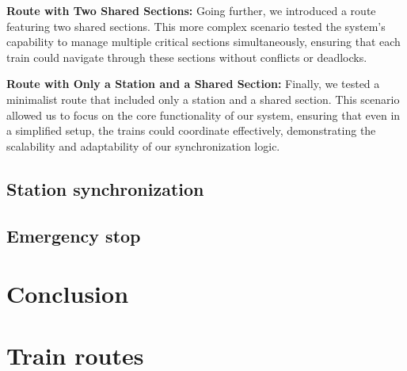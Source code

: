 \documentclass{article}
\begin{document}
    \textbf{Route with Two Shared Sections:} Going further, we introduced a route featuring two shared sections. This more complex scenario tested the system's capability to manage multiple critical sections simultaneously, ensuring that each train could navigate through these sections without conflicts or deadlocks.

    \textbf{Route with Only a Station and a Shared Section:} Finally, we tested a minimalist route that included only a station and a shared section. This scenario allowed us to focus on the core functionality of our system, ensuring that even in a simplified setup, the trains could coordinate effectively, demonstrating the scalability and adaptability of our synchronization logic.


    \subsection*{Station synchronization}

    \subsection*{Emergency stop}

    \section{Conclusion}

    \appendix

    \section{Train routes}
\end{document}
